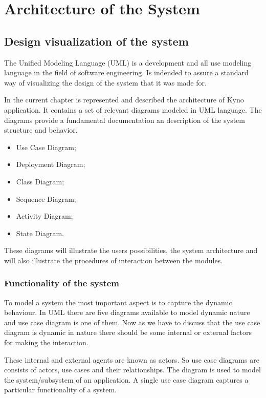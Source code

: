 \section{Architecture of the System}
\subsection{Design visualization of the system}
The Unified Modeling Language (UML)\cite{uml} is a development and all use modeling language in the field of software engineering. Is indended to assure a standard way of visualizing the design of the system that it was made for.

In the current chapter is represented and described the architecture of Kyno application. It contains a set of relevant diagrams modeled in UML language. The diagrams provide a fundamental documentation an description of the system structure and behavior.

\begin{itemize}
\item Use Case Diagram;
\item Deployment Diagram;
\item Class Diagram;
\item Sequence Diagram;
\item Activity Diagram;
\item State Diagram.

\end{itemize}
These diagrams will illustrate the users possibilities, the system architecture and will also illustrate the procedures of interaction between the modules.

\subsubsection{Functionality of the system}
To model a system the most important aspect is to capture the dynamic behaviour. In UML there are five diagrams available to model dynamic nature and use case diagram is one of them. Now as we have to discuss that the use case diagram is dynamic in nature there should be some internal or external factors for making the interaction.

These internal and external agents are known as actors. So use case diagrams are consists of actors, use cases and their relationships. The diagram is used to model the system/subsystem of an application. A single use case diagram captures a particular functionality of a system.

